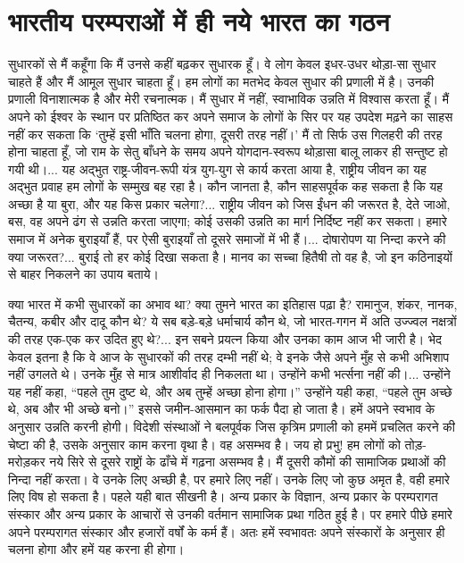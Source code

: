 \section*{भारतीय परम्पराओं में ही नये भारत का गठन}


सुधारकों से मैं कहूँगा कि मैं उनसे कहीं बढ़कर सुधारक हूँ। वे लोग केवल इधर-उधर थोड़ा-सा सुधार चाहते हैं और मैं आमूल सुधार चाहता हूँ। हम लोगों का मतभेद केवल सुधार की प्रणाली में है। उनकी प्रणाली विनाशात्मक है और मेरी रचनात्मक। मैं सुधार में नहीं, स्वाभाविक उन्नति में विश्वास करता हूँ। मैं अपने को ईश्वर के स्थान पर प्रतिष्ठित कर अपने समाज के लोगों के सिर पर यह उपदेश मढ़ने का साहस नहीं कर सकता कि ‘तुम्हें इसी भाँति चलना होगा, दूसरी तरह नहीं।’ मैं तो सिर्फ उस गिलहरी की तरह होना चाहता हूँ, जो राम के सेतु बाँधने के समय अपने योगदान-स्वरूप थोड़ासा बालू लाकर ही सन्तुष्ट हो गयी थी।... यह अद्भुत राष्ट्र-जीवन-रूपी यंत्र युग-युग से कार्य करता आया है, राष्ट्रीय जीवन का यह अद्भुत प्रवाह हम लोगों के सम्मुख बह रहा है। कौन जानता है, कौन साहसपूर्वक कह सकता है कि यह अच्छा है या बुरा, और यह किस प्रकार चलेगा?... राष्ट्रीय जीवन को जिस ईंधन की जरूरत है, देते जाओ, बस, वह अपने ढंग से उन्नति करता जाएगा; कोई उसकी उन्नति का मार्ग निर्दिष्ट नहीं कर सकता। हमारे समाज में अनेक बुराइयाँ हैं, पर ऐसी बुराइयाँ तो दूसरे समाजों में भी हैं।... दोषारोपण या निन्दा करने की क्या जरूरत?... बुराई तो हर कोई दिखा सकता है। मानव का सच्चा हितैषी तो वह है, जो इन कठिनाइयों से बाहर निकलने का उपाय बताये। 

क्या भारत में कभी सुधारकों का अभाव था? क्या तुमने भारत का इतिहास पढ़ा है? रामानुज, शंकर, नानक, चैतन्य, कबीर और दादू कौन थे? ये सब बड़े-बड़े धर्माचार्य कौन थे, जो भारत-गगन में अति उज्ज्वल नक्षत्रों की तरह एक-एक कर उदित हुए थे?... इन सबने प्रयत्न किया और उनका काम आज भी जारी है। भेद केवल इतना है कि वे आज के सुधारकों की तरह दम्भी नहीं थे; वे इनके जैसे अपने मुँह से कभी अभिशाप नहीं उगलते थे। उनके मुँह से मात्र आशीर्वाद ही निकलता था। उन्होंने कभी भर्त्सना नहीं की।... उन्होंने यह नहीं कहा, “पहले तुम दुष्ट थे, और अब तुम्हें अच्छा होना होगा।” उन्होंने यही कहा, “पहले तुम अच्छे थे, अब और भी अच्छे बनो।” इससे जमीन-आसमान का फर्क पैदा हो जाता है। हमें अपने स्वभाव के अनुसार उन्नति करनी होगी। विदेशी संस्थाओं ने बलपूर्वक जिस कृत्रिम प्रणाली को हममें प्रचलित करने की चेष्टा की है, उसके अनुसार काम करना वृथा है। वह असम्भव है। जय हो प्रभु! हम लोगों को तोड़-मरोड़कर नये सिरे से दूसरे राष्ट्रों के ढाँचे में गढ़ना असम्भव है। मैं दूसरी कौमों की सामाजिक प्रथाओं की निन्दा नहीं करता। वे उनके लिए अच्छी है, पर हमारे लिए नहीं। उनके लिए जो कुछ अमृत है, वही हमारे लिए विष हो सकता है। पहले यही बात सीखनी है। अन्य प्रकार के विज्ञान, अन्य प्रकार के परम्परागत संस्कार और अन्य प्रकार के आचारों से उनकी वर्तमान सामाजिक प्रथा गठित हुई है। पर हमारे पीछे हमारे अपने परम्परागत संस्कार और हजारों वर्षों के कर्म हैं। अतः हमें स्वभावतः अपने संस्कारों के अनुसार ही चलना होगा और हमें यह करना ही होगा।



